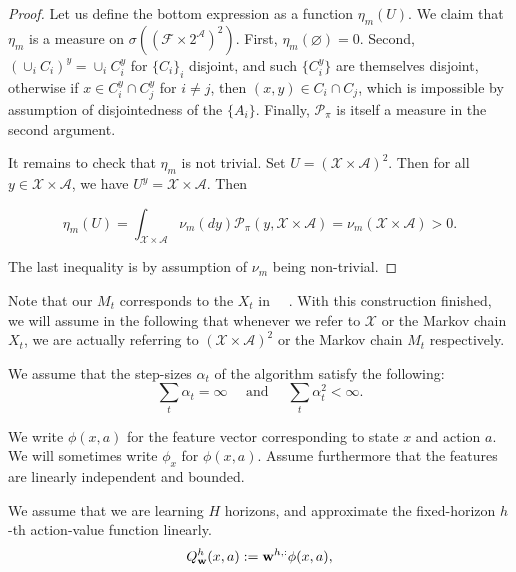 \begin{appendices}
\begin{proof}
\noindent Let us define the bottom expression as a function $\eta_m(U)$. We claim that $\eta_m$ is a measure on $\sigma((\mathcal{F} \times 2^\mathcal{A})^2)$. First, $\eta_m(\varnothing) = 0$. Second, $(\cup_i C_i)^y = \cup_i C_i^y$ for $\{C_i\}_i$ disjoint, and such $\{C_i^y\}$ are themselves disjoint, otherwise if $x \in C_i^y \cap C_j^y$ for $i \neq j$, then $(x, y) \in C_i \cap C_j$, which is impossible by assumption of disjointedness of the $\{A_i\}$. Finally, $\mathcal{P}_\pi$ is itself a measure in the second argument.

It remains to check that $\eta_m$ is not trivial. Set $U = (\mathcal{X} \times \mathcal{A})^2$. Then for all $y \in \mathcal{X} \times \mathcal{A}$, we have $U^y = \mathcal{X} \times \mathcal{A}$. Then

\begin{equation*}
    \eta_m(U) = \int_{\mathcal{X} \times \mathcal{A}} \nu_m(dy) \mathcal{P}_\pi(y, \mathcal{X} \times \mathcal{A}) = \nu_m(\mathcal{X} \times \mathcal{A}) > 0.
\end{equation*}

\noindent The last inequality is by assumption of $\nu_m$ being non-trivial.
\end{proof}

Note that our $M_t$ corresponds to the $X_t$ in ~\citeauthor[p.213]{benveniste1990stochastic}~. With this construction finished, we will assume in the following that whenever we refer to $\mathcal{X}$ or the Markov chain $X_t$, we are actually referring to $(\mathcal{X} \times \mathcal{A})^2$ or the Markov chain $M_t$ respectively.

We assume that the step-sizes $\alpha_t$ of the algorithm satisfy the following:
$$
    \sum_{t} \alpha_t = \infty\quad\text{  and  }\quad
    \sum_{t} \alpha_t^2 < \infty.
$$


We write $\phi(x, a)$ for the feature vector corresponding to state $x$ and action $a$. We will sometimes write $\phi_x$ for $\phi(x, a)$. Assume furthermore that the features are linearly independent and bounded.

We assume that we are learning $H$ horizons, and approximate the fixed-horizon $h$-th action-value function linearly.
\begin{equation*}
    Q^h_{\mathbf{w}}(x, a) :=  \mathbf{w}^{h, :} \phi(x, a),
\end{equation*}


\end{appendices}
